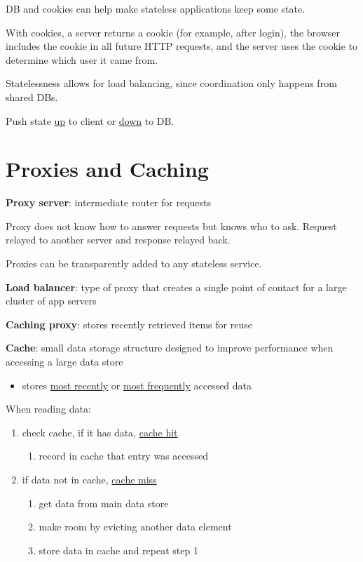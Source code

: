 \documentclass[11pt]{article}
\begin{document}
DB and cookies can help make stateless applications keep some state.

With cookies, a server returns a cookie (for example, after login), the browser
includes the cookie in all future HTTP requests, and the server uses the cookie
to determine which user it came from.

Statelessness allows for load balancing, since coordination only happens from
shared DBs.

Push state \uline{up} to client or \uline{down} to DB.
\section{Proxies and Caching}
\label{sec:orgc859192}
\textbf{Proxy server}: intermediate router for requests

Proxy does not know how to answer requests but knows who to ask.
Request relayed to another server and response relayed back.

Proxies can be transparently added to any stateless service.

\textbf{Load balancer}: type of proxy that creates a single point of contact
for a large cluster of app servers

\textbf{Caching proxy}: stores recently retrieved items for reuse

\textbf{Cache}: small data storage structure designed to improve performance when
accessing a large data store
\begin{itemize}
\item stores \uline{most recently} or \uline{most frequently} accessed data
\end{itemize}

When reading data:
\begin{enumerate}
\item check cache, if it has data, \uline{cache hit}
\begin{enumerate}
\item record in cache that entry was accessed
\end{enumerate}
\item if data not in cache, \uline{cache miss}
\begin{enumerate}
\item get data from main data store
\item make room by evicting another data element
\item store data in cache and repeat step 1
\end{enumerate}
\end{enumerate}
\end{document}
